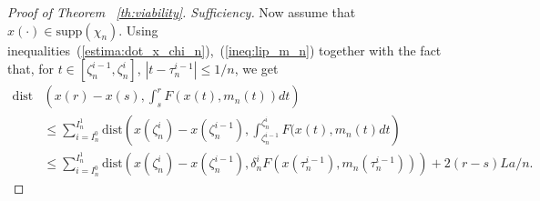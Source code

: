 \documentclass[12pt]{article}
\begin{document}
\begin{proof}[Proof of Theorem ~\ref{th:viability}. Sufficiency]
Now assume that $x(\cdot)\in \mathrm{supp}(\chi_n)$. Using inequalities~(\ref{estima:dot_x_chi_n}),~(\ref{ineq:lip_m_n}) together with the fact that, for $t\in [\zeta_n^{i-1},\zeta_n^i]$, $|t-\tau_n^{i-1}|\leq 1/n$, we get
\begin{equation*}\label{ineq:dist_x_m_n}
\begin{split}\mathrm{dist}&\left(x(r)-x(s),\int_s^r F(x(t),m_n(t))d t\right)\\&\leq
\sum_{i=I_n^0}^{I^1_n}\mathrm{dist}\left(x(\zeta^i_n)-x(\zeta^{i-1}_n),\int_{\zeta^{i-1}_n}^{\zeta^i_n} F(x(t),m_n(t)dt\right)\\
&\leq 
\sum_{i=I_n^0}^{I^1_n}\mathrm{dist}\left(x(\zeta^i_n)-x(\zeta^{i-1}_n), \delta^i_nF(x(\tau^{i-1}_n),m_n(\tau^{i-1}_n))\right)+2(r-s)La/n.
\end{split}
\end{equation*}


\end{proof}
\end{document}

